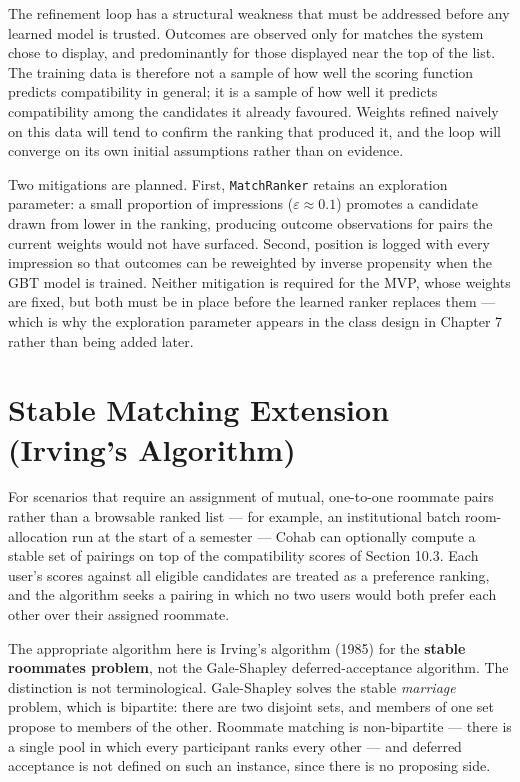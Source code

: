 \documentclass[12pt,a4paper]{report}
\begin{document}
The refinement loop has a structural weakness that must be addressed before any learned model is trusted. Outcomes are observed only for matches the system chose to display, and predominantly for those displayed near the top of the list. The training data is therefore not a sample of how well the scoring function predicts compatibility in general; it is a sample of how well it predicts compatibility among the candidates it already favoured. Weights refined naively on this data will tend to confirm the ranking that produced it, and the loop will converge on its own initial assumptions rather than on evidence.

Two mitigations are planned. First, \texttt{MatchRanker} retains an exploration parameter: a small proportion of impressions ($\varepsilon \approx 0.1$) promotes a candidate drawn from lower in the ranking, producing outcome observations for pairs the current weights would not have surfaced. Second, position is logged with every impression so that outcomes can be reweighted by inverse propensity when the GBT model is trained. Neither mitigation is required for the MVP, whose weights are fixed, but both must be in place before the learned ranker replaces them --- which is why the exploration parameter appears in the class design in Chapter 7 rather than being added later.

\section{Stable Matching Extension (Irving's Algorithm)}

For scenarios that require an assignment of mutual, one-to-one roommate pairs rather than a browsable ranked list --- for example, an institutional batch room-allocation run at the start of a semester --- Cohab can optionally compute a stable set of pairings on top of the compatibility scores of Section 10.3. Each user's scores against all eligible candidates are treated as a preference ranking, and the algorithm seeks a pairing in which no two users would both prefer each other over their assigned roommate.

The appropriate algorithm here is Irving's algorithm (1985) for the \textbf{stable roommates problem}, not the Gale-Shapley deferred-acceptance algorithm. The distinction is not terminological. Gale-Shapley solves the stable \emph{marriage} problem, which is bipartite: there are two disjoint sets, and members of one set propose to members of the other. Roommate matching is non-bipartite --- there is a single pool in which every participant ranks every other --- and deferred acceptance is not defined on such an instance, since there is no proposing side.
\end{document}
